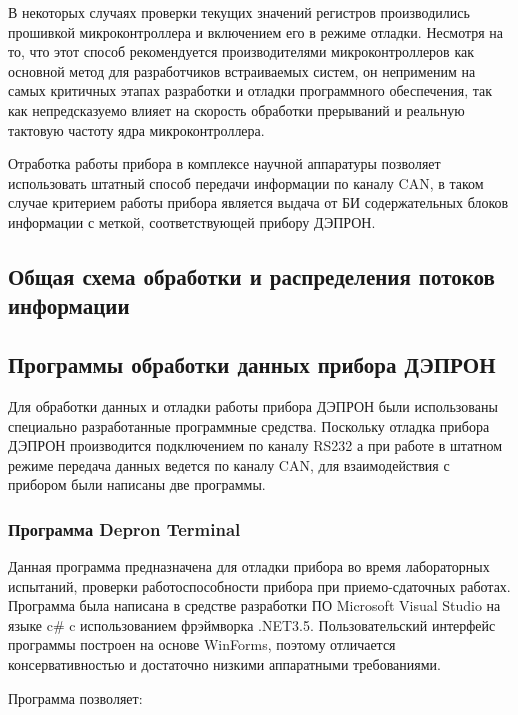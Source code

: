 \documentclass[a4paper,portrait,12pt]{article}
\begin{document}
{{{{В некоторых случаях проверки текущих значений регистров производились прошивкой микроконтроллера и включением его в режиме отладки. Несмотря на то, что этот способ рекомендуется производителями микроконтроллеров как основной метод для разработчиков встраиваемых систем, он неприменим на самых критичных этапах разработки и отладки программного обеспечения, так как непредсказуемо влияет на скорость обработки прерываний и реальную тактовую частоту ядра микроконтроллера.


Отработка работы прибора в комплексе научной аппаратуры позволяет использовать штатный способ передачи информации по каналу CAN, в таком случае критерием работы прибора является выдача от БИ содержательных блоков информации с меткой, соответствующей прибору ДЭПРОН. 


\subsection*{	\textbf{Общая схема обработки и распределения потоков информации}\textbf{ }}




\subsection*{	\textbf{Программ}\textbf{ы}\textbf{ обработки }\textbf{данных }\textbf{прибора ДЭПРОН}}

Для обработки данных и отладки работы прибора ДЭПРОН были использованы специально разработанные программные средства. Поскольку отладка прибора ДЭПРОН производится подключением по каналу RS232 а при работе в штатном режиме передача данных ведется по каналу CAN, для взаимодействия с прибором были написаны две программы.


\subsubsection*{\textbf{Программа Depron}\textbf{ }\textbf{Terminal}}

Данная программа предназначена для отладки прибора во время лабораторных испытаний, проверки работоспособности прибора при приемо-сдаточных работах. Программа была написана в средстве разработки ПО Microsoft Visual Studio на языке c\# c использованием фрэймворка .NET3.5. Пользовательский интерфейс программы построен на основе WinForms, поэтому отличается консервативностью и достаточно низкими аппаратными требованиями.


Программа позволяет:


}}}}
\end{document}

